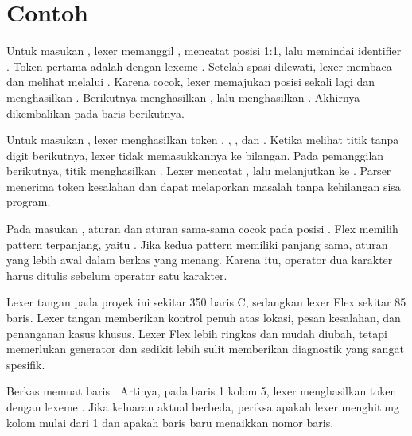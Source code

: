 \section*{Contoh}

\begin{contoh}
Untuk masukan , lexer memanggil ,
mencatat posisi 1:1, lalu memindai identifier . Token
pertama adalah  dengan lexeme . Setelah spasi
dilewati, lexer membaca \code{<} dan melihat \code{=} melalui
. Karena \code{<=} cocok, lexer memajukan posisi sekali
lagi dan menghasilkan . Berikutnya  menghasilkan
, lalu \code{;} menghasilkan . Akhirnya
 dikembalikan pada baris berikutnya.
\end{contoh}

\begin{contoh}
Untuk masukan , lexer menghasilkan token
, , , dan .
Ketika melihat titik tanpa digit berikutnya, lexer tidak
memasukkannya ke bilangan. Pada pemanggilan berikutnya, titik
menghasilkan . Lexer mencatat
, lalu melanjutkan
ke \code{;}. Parser menerima token kesalahan dan dapat melaporkan
masalah tanpa kehilangan sisa program.
\end{contoh}

\begin{contoh}
Pada masukan , aturan  dan aturan 
sama-sama cocok pada posisi \code{<}. Flex memilih pattern
terpanjang, yaitu . Jika kedua pattern memiliki panjang
sama, aturan yang lebih awal dalam berkas yang menang. Karena itu,
operator dua karakter harus ditulis sebelum operator satu karakter.
\end{contoh}

\begin{contoh}
Lexer tangan pada proyek ini sekitar 350 baris C, sedangkan lexer
Flex sekitar 85 baris. Lexer tangan memberikan kontrol penuh atas
lokasi, pesan kesalahan, dan penanganan kasus khusus. Lexer Flex
lebih ringkas dan mudah diubah, tetapi memerlukan generator dan
sedikit lebih sulit memberikan diagnostik yang sangat spesifik.
\end{contoh}

\begin{contoh}
Berkas  memuat baris
. Artinya, pada baris 1 kolom 5, lexer
menghasilkan token  dengan lexeme . Jika
keluaran aktual berbeda, periksa apakah lexer menghitung kolom
mulai dari 1 dan apakah baris baru menaikkan nomor baris.
\end{contoh}
